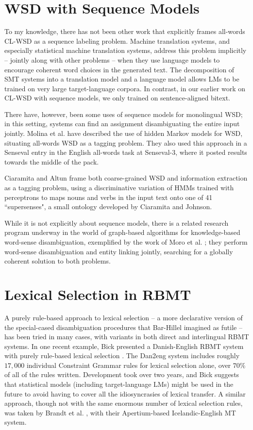 \section{WSD with Sequence Models}
To my knowledge, there has not been other work that explicitly frames all-words
CL-WSD as a sequence labeling problem. Machine translation systems, and
especially statistical machine translation systems, address this problem
implicitly -- jointly along with other problems -- when they use language
models to encourage coherent word choices in the generated text. The
decomposition of SMT systems into a translation model and a language model
allows LMs to be trained on very large target-language corpora.  In contrast,
in our earlier work on CL-WSD with sequence models, we only trained on
sentence-aligned bitext.

There have, however, been some uses of sequence models for monolingual WSD; in
this setting, systems can find an assignment disambiguating the entire input
jointly.  Molina et al. \cite{DBLP:conf/iberamia/MolinaPS02} have described the
use of hidden Markov models for WSD, situating all-words WSD as a tagging
problem.  They also used this approach in a Senseval entry
\cite{molina-pla-segarra:2004:Senseval-3} in the English all-words task at
Senseval-3, where it posted results towards the middle of the pack.

Ciaramita and Altun \cite{ciaramita-altun:2006:EMNLP} frame both coarse-grained
WSD and information extraction as a tagging problem, using a discriminative
variation of HMMs trained with perceptrons \cite{collins:2002:EMNLP02}
to maps nouns and verbs in the input text onto one of 41 ``supersenses", a
small ontology developed by Ciaramita and Johnson.

While it is not explicitly about sequence models, there is a related research
program underway in the world of graph-based algorithms for knowledge-based
word-sense disambiguation, exemplified by the work of Moro et al.
\cite{DBLP:journals/tacl/0001RN14}; they perform word-sense disambiguation and
entity linking jointly, searching for a globally coherent solution to both
problems.

\section{Lexical Selection in RBMT}
A purely rule-based approach to lexical selection -- a more declarative version
of the special-cased disambiguation procedures that Bar-Hillel imagined as
futile -- has been tried in many cases, with variants in both direct and
interlingual RBMT systems.
In one recent example, Bick presented a Danish-English RBMT system with purely
rule-based lexical selection \cite{bickdan2eng}. The Dan2eng system includes
roughly $17,000$ individual Constraint Grammar rules for lexical selection
alone, over $70\%$ of all of the rules written. Development took over two
years, and Bick suggests that statistical models (including target-language
LMs) might be used in the future to avoid having to cover all the
idiosyncrasies of lexical transfer.
A similar approach, though not with the same enormous number of lexical
selection rules, was taken by Brandt et al. \cite{brandt2011apertium}, with
their Apertium-based Icelandic-English MT system.

